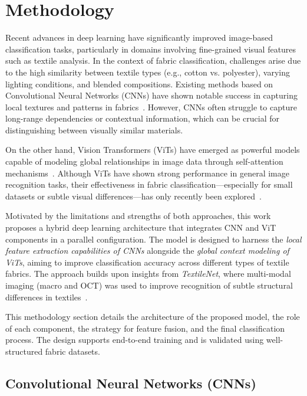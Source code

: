\section{Methodology}

Recent advances in deep learning have significantly improved image-based classification tasks, particularly in domains involving fine-grained visual features such as textile analysis. In the context of fabric classification, challenges arise due to the high similarity between textile types (e.g., cotton vs. polyester), varying lighting conditions, and blended compositions. Existing methods based on Convolutional Neural Networks (CNNs) have shown notable success in capturing local textures and patterns in fabrics~\cite{hong2024research, kampouris2016fine}. However, CNNs often struggle to capture long-range dependencies or contextual information, which can be crucial for distinguishing between visually similar materials.

On the other hand, Vision Transformers (ViTs) have emerged as powerful models capable of modeling global relationships in image data through self-attention mechanisms~\cite{dosovitskiy2020vit}. Although ViTs have shown strong performance in general image recognition tasks, their effectiveness in fabric classification—especially for small datasets or subtle visual differences—has only recently been explored~\cite{chitra2023fabric}.

Motivated by the limitations and strengths of both approaches, this work proposes a hybrid deep learning architecture that integrates CNN and ViT components in a parallel configuration. The model is designed to harness the \textit{local feature extraction capabilities of CNNs} alongside the \textit{global context modeling of ViTs}, aiming to improve classification accuracy across different types of textile fabrics. The approach builds upon insights from \textit{TextileNet}, where multi-modal imaging (macro and OCT) was used to improve recognition of subtle structural differences in textiles~\cite{siam2023textilenet}.

This methodology section details the architecture of the proposed model, the role of each component, the strategy for feature fusion, and the final classification process. The design supports end-to-end training and is validated using well-structured fabric datasets.

\subsection{Convolutional Neural Networks (CNNs)}

